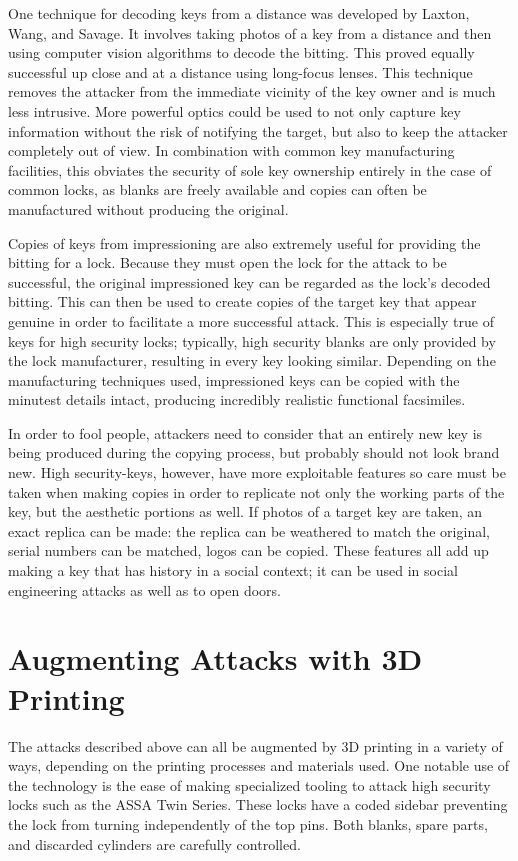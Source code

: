 \documentclass{acm_proc_article-sp}
\begin{document}
One technique for decoding keys from a distance was developed by Laxton, Wang, and Savage. It involves taking photos of a key from a distance and then using computer vision algorithms to decode the bitting. This proved equally successful up close and at a distance using long-focus lenses. This technique removes the attacker from the immediate vicinity of the key owner and is much less intrusive. More powerful optics could be used to not only capture key information without the risk of notifying the target, but also to keep the attacker completely out of view. In combination with common key manufacturing facilities, this obviates the security of sole key ownership entirely in the case of common locks, as blanks are freely available and copies can often be manufactured without producing the original.

Copies of keys from impressioning are also extremely useful for providing the bitting for a lock. Because they must open the lock for the attack to be successful, the original impressioned key can be regarded as the lock's decoded bitting. This can then be used to create copies of the target key that appear genuine in order to facilitate a more successful attack. This is especially true of keys for high security locks; typically, high security blanks are only provided by the lock manufacturer, resulting in every key looking similar. Depending on the manufacturing techniques used, impressioned keys can be copied with the minutest details intact, producing incredibly realistic functional facsimiles.

In order to fool people, attackers need to consider that an entirely new key is being produced during the copying process, but probably should not look brand new. High security-keys, however, have more exploitable features so care must be taken when making copies in order to replicate not only the working parts of the key, but the aesthetic portions as well. If photos of a target key are taken, an exact replica can be made: the replica can be weathered to match the original, serial numbers can be matched, logos can be copied. These features all add up making a key that has history in a social context; it can be used in social engineering attacks as well as to open doors.

\section{Augmenting Attacks with 3D Printing}
The attacks described above can all be augmented by 3D printing in a variety of ways, depending on the printing processes and materials used. One notable use of the technology is the ease of making specialized tooling to attack high security locks such as the ASSA Twin Series. These locks have a coded sidebar preventing the lock from turning independently of the top pins. Both blanks, spare parts, and discarded cylinders are carefully controlled.
\end{document}
